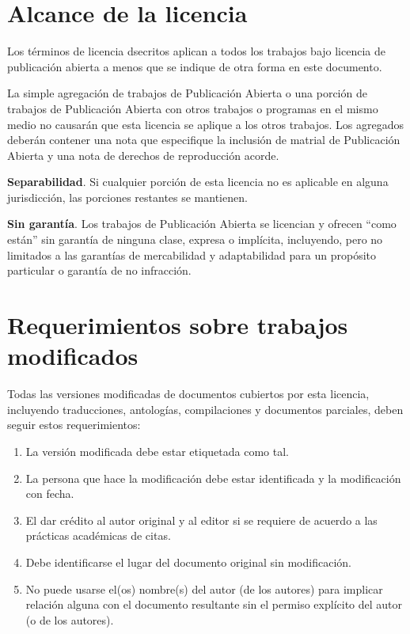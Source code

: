 \section{Alcance de la licencia}

Los términos de licencia dsecritos aplican a todos los trabajos bajo
licencia de publicación abierta a menos que se indique de otra forma
en este documento.

La simple agregación de trabajos de Publicación Abierta o una porción
de trabajos de Publicación Abierta con otros trabajos o programas en
el mismo medio no causarán que esta licencia se aplique a los otros
trabajos.  Los agregados deberán contener una nota que especifique la
inclusión de matrial de Publicación Abierta y una nota de derechos de
reproducción acorde.

\textbf{Separabilidad}. Si cualquier porción de esta licencia no es
aplicable en alguna jurisdicción, las porciones restantes se
mantienen.

\textbf{Sin garantía}.  Los trabajos de Publicación Abierta se
licencian y ofrecen ``como están'' sin garantía de ninguna clase,
expresa o implícita, incluyendo, pero no limitados a las garantías de
mercabilidad y adaptabilidad para un propósito particular o garantía
de no infracción.

\section{Requerimientos sobre trabajos modificados}

Todas las versiones modificadas de documentos cubiertos por esta
licencia, incluyendo traducciones, antologías, compilaciones y
documentos parciales, deben seguir estos requerimientos:

\begin{enumerate}
\item La versión modificada debe estar etiquetada como tal.
\item La persona que hace la modificación debe estar identificada y la
  modificación con fecha.
\item El dar crédito al autor original y al editor si se requiere de
  acuerdo a las prácticas académicas de citas.
\item Debe identificarse el lugar del documento original sin
  modificación.
\item No puede usarse el(os) nombre(s) del autor (de los autores) para
  implicar relación alguna con el documento resultante sin el permiso
  explícito del autor (o de los autores).
\end{enumerate}


